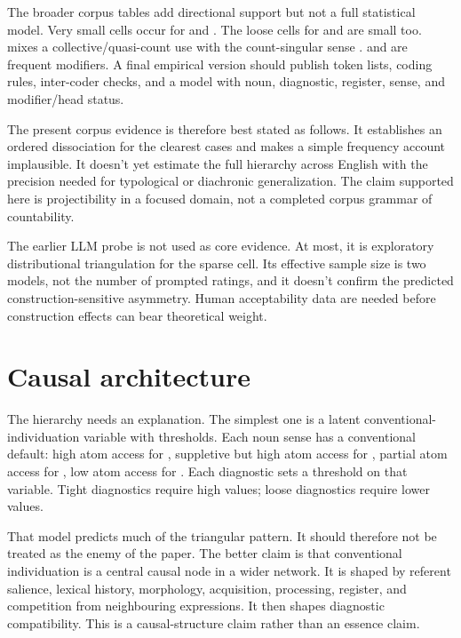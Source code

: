 \documentclass[12pt,a4paper]{article}
\begin{document}
The broader corpus tables add directional support but not a full statistical model. Very small cells occur for  and . The loose cells for  and  are small too.  mixes a collective/quasi-count use with the count-singular sense .  and  are frequent modifiers. A final empirical version should publish token lists, coding rules, inter-coder checks, and a model with noun, diagnostic, register, sense, and modifier/head status.

The present corpus evidence is therefore best stated as follows. It establishes an ordered dissociation for the clearest cases and makes a simple frequency account implausible. It doesn't yet estimate the full hierarchy across English with the precision needed for typological or diachronic generalization. The claim supported here is projectibility in a focused domain, not a completed corpus grammar of countability.

The earlier LLM probe is not used as core evidence. At most, it is exploratory distributional triangulation for the sparse  cell. Its effective sample size is two models, not the number of prompted ratings, and it doesn't confirm the predicted construction-sensitive asymmetry. Human acceptability data are needed before construction effects can bear theoretical weight.

\section{Causal architecture}\label{sec:causal-v3}

The hierarchy needs an explanation. The simplest one is a latent conventional-individuation variable with thresholds. Each noun sense has a conventional default: high atom access for , suppletive but high atom access for , partial atom access for , low atom access for . Each diagnostic sets a threshold on that variable. Tight diagnostics require high values; loose diagnostics require lower values.

That model predicts much of the triangular pattern. It should therefore not be treated as the enemy of the paper. The better claim is that conventional individuation is a central causal node in a wider network. It is shaped by referent salience, lexical history, morphology, acquisition, processing, register, and competition from neighbouring expressions. It then shapes diagnostic compatibility. This is a causal-structure claim rather than an essence claim.
\end{document}
